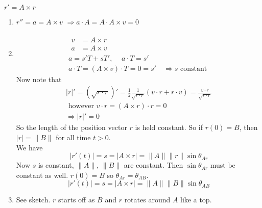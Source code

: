 \documentclass[twoside]{amsart}
\theoremstyle{plain}
\theoremstyle{definition}
\newcommand{\exercisehead}[1]
  {\smallskip
   \noindent{\small\bf Exercise #1.}}
\begin{document}
\exercisehead{15} $r' = A \times r$
\begin{enumerate}
\item $r'' = a = A\times v$  \quad $\Longrightarrow a \cdot A = A \cdot A \times v = 0$
\item 
\[
\begin{gathered}
  \begin{aligned}
    v & = A \times r \\
    a & = A \times v 
  \end{aligned} \\
  a = s'T + sT', \quad \, a\cdot T = s' \\
  a\cdot T = (A \times v) \cdot T = 0 = s' \quad \Longrightarrow s \text{ constant } 
\end{gathered}
\]
Now note that 
\[
\begin{gathered}
  |r|' = (\sqrt{ r\cdot r})' = \frac{1}{2} \frac{1}{\sqrt{ r\cdot r }} (v\cdot r + r\cdot v) = \frac{v\cdot r}{\sqrt{ r\cdot r}} \\
 \text{ however } v\cdot r = (A\times r)\cdot r = 0 \\
 \Longrightarrow |r|' =0
\end{gathered}
\]
So the length of the position vector $r$ is held constant.  So if $r(0) = B$, then $|r|=\| B\|$ for all time $t>0$.  \\

We have 
\[
|r'(t)| = s = |A \times r| = \| A \| \|r \| \sin{ \theta_{Ar}}
\]
Now $s$ is constant, $\|A\|, \, \| B\|$ are constant.  Then $\sin{ \theta_{Ar}}$ must be constant as well.  $r(0) =B$ so $\theta_{Ar} = \theta_{AB}$.  
\[
\boxed{ |r'(t)| = s = |A \times r| = \| A \| \|B \| \sin{ \theta_{AB}} }
\]
\item See sketch.  $r$ starts off as $B$ and $r$ rotates around $A$ like a top.  
\end{enumerate}
\end{document}
